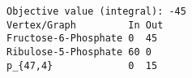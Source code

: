 \begin{verbatim}
Objective value (integral): -45
Vertex/Graph         In Out 
Fructose-6-Phosphate 0  45  
Ribulose-5-Phosphate 60 0   
p_{47,4}             0  15  
\end{verbatim}
